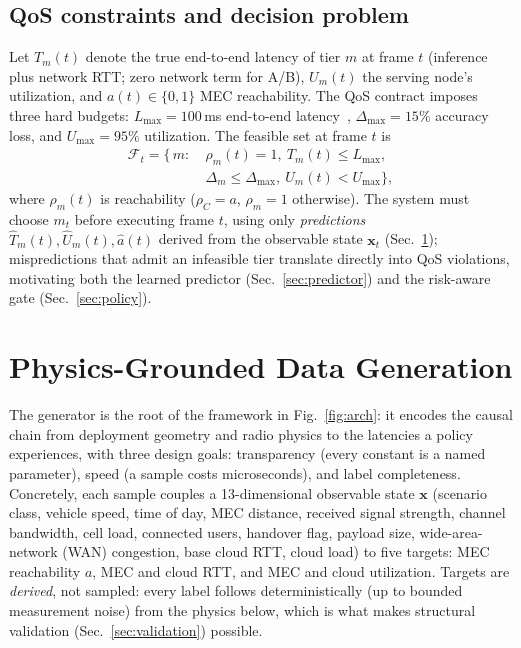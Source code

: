 \documentclass[10pt,conference]{IEEEtran}
\newcommand{\lmax}{L_{\max}}
\newcommand{\dmax}{\Delta_{\max}}
\newcommand{\umax}{U_{\max}}
\begin{document}
\subsection{QoS constraints and decision problem}

Let $T_m(t)$ denote the true end-to-end latency of tier $m$ at frame $t$
(inference plus network RTT; zero network term for A/B), $U_m(t)$ the
serving node's utilization, and $a(t)\in\{0,1\}$ MEC reachability.  The QoS
contract imposes three hard budgets: $\lmax = 100$\,ms end-to-end
latency~\cite{3gpp22186}, $\dmax = 15\%$ accuracy loss, and
$\umax = 95\%$ utilization.  The feasible set at frame $t$ is
\begin{align}
\mathcal{F}_t = \bigl\{\, m :\ &\rho_m(t)=1,\ T_m(t) \le \lmax, \nonumber\\[-1pt]
  &\Delta_m \le \dmax,\ U_m(t) < \umax \bigr\},
\label{eq:feasible}
\end{align}
where $\rho_m(t)$ is reachability ($\rho_C = a$, $\rho_m = 1$ otherwise).
The system must choose $m_t$ before executing frame $t$, using only
\emph{predictions} $\hat T_m(t), \hat U_m(t), \hat a(t)$ derived from the
observable state $\mathbf{x}_t$ (Sec.~\ref{sec:datagen}); mispredictions
that admit an infeasible tier translate directly into QoS violations,
motivating both the learned predictor (Sec.~\ref{sec:predictor}) and the
risk-aware gate (Sec.~\ref{sec:policy}).

\section{Physics-Grounded Data Generation}\label{sec:datagen}

The generator is the root of the framework in Fig.~\ref{fig:arch}: it
encodes the causal chain from deployment geometry and radio physics to
the latencies a policy experiences, with three design goals:
transparency (every constant is a named parameter), speed (a sample
costs microseconds), and label completeness.  Concretely, each sample
couples a 13-dimensional observable state $\mathbf{x}$
(scenario class, vehicle speed, time of day, MEC distance, received signal
strength, channel bandwidth, cell load, connected users, handover flag,
payload size, wide-area-network (WAN) congestion, base cloud RTT, cloud
load) to five targets: MEC reachability $a$, MEC and cloud RTT, and MEC
and cloud utilization.  Targets are \emph{derived}, not sampled: every
label follows deterministically (up to bounded measurement noise) from the
physics below, which is what makes structural validation
(Sec.~\ref{sec:validation}) possible.
\end{document}
